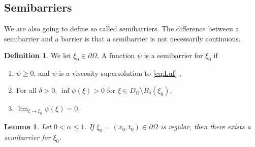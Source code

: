 \documentclass[11pt]{article}
\providecommand{\Rnp}{D_{\Omega}}
\newtheorem{lem}[thm]{Lemma}
\numberwithin{equation}{section}
\theoremstyle{definition}
\newtheorem{definition}[thm]{Definition}
\begin{document}
\subsection{Semibarriers}\label{subsec:semibarriers}
We are also going to define so called semibarriers. The difference between a semibarrier and a barrier is that a semibarrier is not necessarily continuous.
\begin{definition}\label{def:semibarriers}
We let $\xi_0 \in \partial \Omega$. A function $\psi$ is a semibarrier for $\xi_0$ if 
\begin{enumerate}
       \item $\psi \geq 0$, and $\psi$ is a viscosity supersolution to \eqref{eq:Luf} ,
       \item For all $\delta >0$, $\inf \psi(\xi) >0$ for $ \xi \in \Rnp \setminus B_{\delta}(\xi_0)$,
       \item $\lim_{\xi \to \xi_0} \psi(\xi)=0$.
 \end{enumerate}
\end{definition}
\begin{lem}\label{lem:cones2}
Let $0<\alpha \leq 1$. If $\xi_0=(x_0,t_0) \in \partial \Omega$ is regular, then there exists a semibarrier for $\xi_0$. 
\end{lem}
\end{document}
